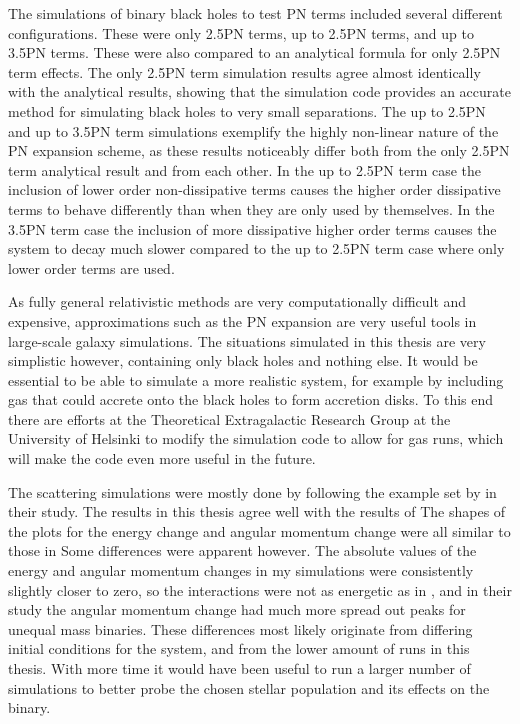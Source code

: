 \documentclass[english, oneside]{HYgradu}
\begin{document}
The simulations of binary black holes to test PN terms included several different configurations. These were only 2.5PN terms, up to 2.5PN terms, and up to 3.5PN terms. These were also compared to an analytical formula for only 2.5PN term effects. The only 2.5PN term simulation results agree almost identically with the analytical results, showing that the simulation code provides an accurate method for simulating black holes to very small separations. The up to 2.5PN and up to 3.5PN term simulations exemplify the highly non-linear nature of the PN expansion scheme, as these results noticeably differ both from the only 2.5PN term analytical result and from each other. In the up to 2.5PN term case the inclusion of lower order non-dissipative terms causes the higher order dissipative terms to behave differently than when they are only used by themselves. In the 3.5PN term case the inclusion of more dissipative higher order terms causes the system to decay much slower compared to the up to 2.5PN term case where only lower order terms are used. 

As fully general relativistic methods are very computationally difficult and expensive, approximations such as the PN expansion are very useful tools in large-scale galaxy simulations. The situations simulated in this thesis are very simplistic however, containing only black holes and nothing else. It would be essential to be able to simulate a more realistic system, for example by including gas that could accrete onto the black holes to form accretion disks. To this end there are efforts at the Theoretical Extragalactic Research Group at the University of Helsinki to modify the simulation code to allow for gas runs, which will make the code even more useful in the future.

The scattering simulations were mostly done by following the example set by \cite{sesana:2006} in their study. The results in this thesis agree well with the results of \citeauthor{sesana:2006} The shapes of the plots for the energy change and angular momentum change were all similar to those in \citeauthor{sesana:2006} Some differences were apparent however. The absolute values of the energy and angular momentum changes in my simulations were consistently slightly closer to zero, so the interactions were not as energetic as in \citeauthor{sesana:2006}, and in their study the angular momentum change had much more spread out peaks for unequal mass binaries. These differences most likely originate from differing initial conditions for the system, and from the lower amount of runs in this thesis. With more time it would have been useful to run a larger number of simulations to better probe the chosen stellar population and its effects on the binary.
\end{document}
